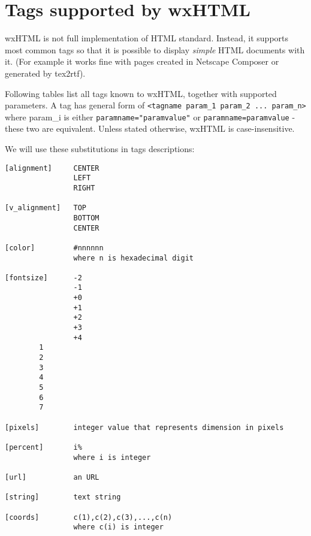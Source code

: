 \section{Tags supported by wxHTML}\label{htmltagssupported}

wxHTML is not full implementation of HTML standard. Instead, it supports most common tags so that it 
is possible to display {\it simple} HTML documents with it. (For example it works fine with pages created
in Netscape Composer or generated by tex2rtf).

Following tables list all tags known to wxHTML, together with supported parameters.
A tag has general form of {\tt <tagname param\_1 param\_2 ... param\_n>} where param\_i is
either {\tt paramname="paramvalue"} or {\tt paramname=paramvalue} - these two are equivalent. Unless stated 
otherwise, wxHTML is case-insensitive.



We will use these substitutions in tags descriptions:

\begin{verbatim}
[alignment]     CENTER
                LEFT
                RIGHT

[v_alignment]   TOP
                BOTTOM
                CENTER
                
[color]         #nnnnnn
                where n is hexadecimal digit

[fontsize]      -2
                -1
                +0
                +1
                +2
                +3
                +4
		1
		2
		3
		4
		5
		6
		7

[pixels]        integer value that represents dimension in pixels

[percent]       i% 
                where i is integer

[url]           an URL 

[string]        text string

[coords]        c(1),c(2),c(3),...,c(n)
                where c(i) is integer

\end{verbatim}




